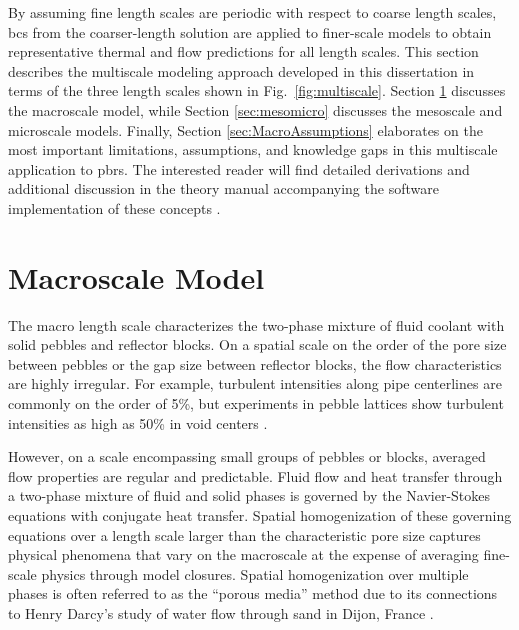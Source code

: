 By assuming fine length scales are periodic with respect to coarse length scales, \glspl{bc} from the coarser-length solution are applied to finer-scale models to obtain representative thermal and flow predictions for all length scales. This section describes the multiscale modeling approach developed in this dissertation in terms of the three length scales shown in Fig.\ \ref{fig:multiscale}. Section \ref{sec:macro_deriv} discusses the macroscale model, while Section \ref{sec:mesomicro} discusses the mesoscale and microscale models. Finally, Section \ref{sec:MacroAssumptions} elaborates on the most important limitations, assumptions, and knowledge gaps in this multiscale application to \glspl{pbr}. The interested reader will find detailed derivations and additional discussion in the theory manual accompanying the software implementation of these concepts \cite{novak_manual}. 

\section{Macroscale Model}
\label{sec:macro_deriv}

The macro length scale characterizes the two-phase mixture of fluid coolant with solid pebbles and reflector blocks. On a spatial scale on the order of the pore size between pebbles or the gap size between reflector blocks, the flow characteristics are highly irregular. For example, turbulent intensities along pipe centerlines are commonly on the order of 5\%, but experiments in pebble lattices show turbulent intensities as high as 50\% in void centers \cite{mickley}. 

However, on a scale encompassing small groups of pebbles or blocks, averaged flow properties are regular and predictable. Fluid flow and heat transfer through a two-phase mixture of fluid and solid phases is governed by the Navier-Stokes equations with conjugate heat transfer. Spatial homogenization of these governing equations over a length scale larger than the characteristic pore size captures physical phenomena that vary on the macroscale at the expense of averaging fine-scale physics through model closures. Spatial homogenization over multiple phases is often referred to as the ``porous media'' method due to its connections to Henry Darcy's study of water flow through sand in Dijon, France \cite{darcy}.

